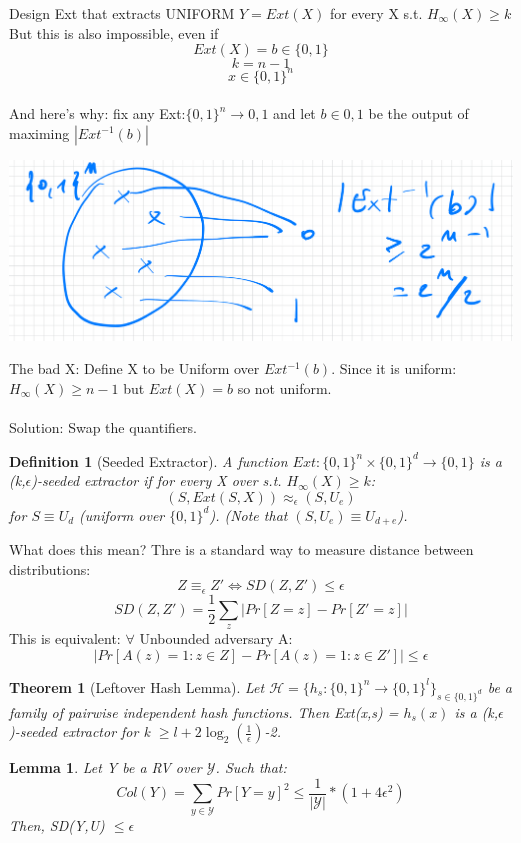 \documentclass[11pt, a4paper]{article}
\newtheorem{thm}{Theorem}
\newtheorem{defn}{Definition}
\newtheorem{lem}{Lemma}
\begin{document}
Design Ext that extracts UNIFORM $Y=Ext(X)$ for every X s.t. $H_\infty (X) \geq k$\\
But this is also impossible, even if $$Ext(X)= b \in \{0,1\}$$ $$k = n-1$$ $$x \in \{0,1\}^n$$\\
And here's why: fix any Ext:$\{0,1\}^n \rightarrow {0,1}$ and let $b \in {0,1}$ be the output of maximing $|Ext^{-1}(b)|$\\
\begin{center}
    \includegraphics[scale=0.3]{img/expl.png}
\end{center}
The bad X: Define X to be Uniform over $Ext^{-1}(b)$. Since it is uniform: $H_\infty(X) \geq n-1$ but $Ext(X) = b$ so not uniform.\\\\
Solution: Swap the quantifiers.
\begin{defn}[Seeded Extractor]
    A function $Ext: \{0,1\}^n \times \{0,1\}^d \rightarrow \{0,1\}$ is a (k,$\epsilon$)-seeded extractor if for every X over s.t. $H_\infty(X) \geq k$: $$(S,Ext(S,X)) \approx_\epsilon (S,U_e)$$
    for $S \equiv U_d$ (uniform over $\{0,1\}^d$). (Note that $(S,U_e) \equiv U_{d+e}$).
\end{defn}
What does this mean? Thre is a standard way to measure distance between distributions:
$$ Z \equiv_\epsilon Z' \iff SD(Z,Z') \leq \epsilon$$
$$ SD(Z,Z') = \frac{1}{2} \sum_{z} |Pr[Z=z] - Pr[Z'=z]|$$
This is equivalent: $\forall$ Unbounded adversary A:
$$|Pr[A(z)=1 : z \in Z] - Pr[A(z)=1 : z \in Z']| \leq \epsilon$$
\begin{thm}[Leftover Hash Lemma]
    Let $\mathcal{H} = \{h_s: \{0,1\}^n \rightarrow \{0,1\}^l\}_{s \in \{0,1\}^d}$ be a family of pairwise independent hash functions. Then Ext(x,s) = $h_s(x)$ is a (k,$\epsilon$)-seeded extractor for k $\geq l + 2\log_2(\frac{1}{\epsilon})$-2.

\end{thm}
\begin{lem}
    Let Y be a RV over $\mathcal{Y}$. Such that:
    $$Col(Y) = \sum_{y \in \mathcal{Y}} Pr[Y=y]^2 \leq \frac{1}{|\mathcal{Y}|} * (1 + 4\epsilon^2)$$
    Then, SD(Y,U) $\leq \epsilon$
\end{lem}
\end{document}
